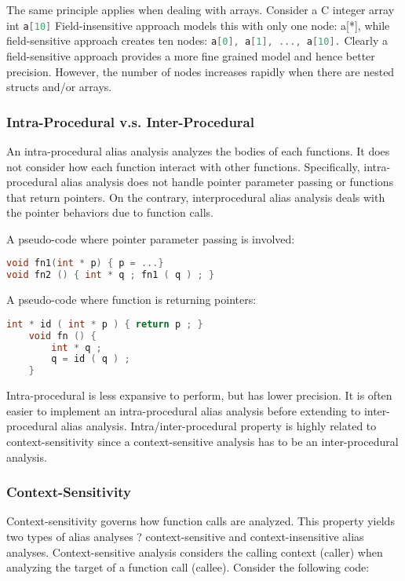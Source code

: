 The same principle applies when dealing with arrays. Consider a C integer array int \lstinline[language=C]|a[10]|
Field-insensitive approach models this with only one node: a[*], while field-sensitive approach
creates ten nodes: \lstinline[language=C]|a[0], a[1], ..., a[10].|
Clearly a field-sensitive approach provides a more fine grained model and hence better precision. However, the number of nodes increases rapidly when there are nested structs and/or
arrays.


\subsubsection{Intra-Procedural v.s. Inter-Procedural}

An intra-procedural alias analysis analyzes the bodies of each functions. It does not consider
how each function interact with other functions. Specifically, intra-procedural alias analysis does
not handle pointer parameter passing or functions that return pointers. On the contrary, interprocedural alias analysis deals with the pointer behaviors due to function calls.

A pseudo-code where pointer parameter passing is involved:

\begin{lstlisting}[language=C]
void fn1(int * p) { p = ...}
void fn2 () { int * q ; fn1 ( q ) ; }
\end{lstlisting}


A pseudo-code where function is returning pointers:
\begin{lstlisting}[language=C]
    int * id ( int * p ) { return p ; }
    void fn () {
        int * q ;
        q = id ( q ) ;
    }
\end{lstlisting}

Intra-procedural is less expansive to perform, but has lower precision. It is often easier to
implement an intra-procedural alias analysis before extending to inter-procedural alias analysis.
Intra/inter-procedural property is highly related to context-sensitivity since a context-sensitive
analysis has to be an inter-procedural analysis.


\subsubsection{Context-Sensitivity}
Context-sensitivity governs how function calls are analyzed. This property yields two types of
alias analyses ? context-sensitive and context-insensitive alias analyses. Context-sensitive analysis
considers the calling context (caller) when analyzing the target of a function call (callee). Consider
the following code:


